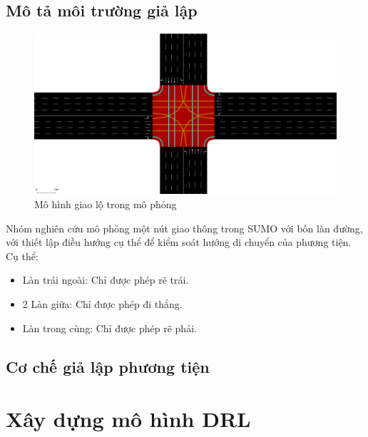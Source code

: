 \subsection{Mô tả môi trường giả lập}
\begin{figure}[!htp]
    \centering
    \includegraphics[width=\textwidth]{figures/sumo_map}
    \caption{Mô hình giao lộ trong mô phỏng}
    \label{fig:sumo_map}
\end{figure}

Nhóm nghiên cứu mô phỏng một nút giao thông trong SUMO với bốn làn đường, với thiết lập điều hướng cụ thể để kiểm soát hướng di chuyển của phương tiện. Cụ thể:
\begin{itemize}
    \item Làn trái ngoài: Chỉ được phép rẽ trái.

    \item 2 Làn giữa: Chỉ được phép đi thẳng.

    \item Làn trong cùng: Chỉ được phép rẽ phải.
\end{itemize}
\subsection{Cơ chế giả lập phương tiện}



\section{Xây dựng mô hình DRL}
